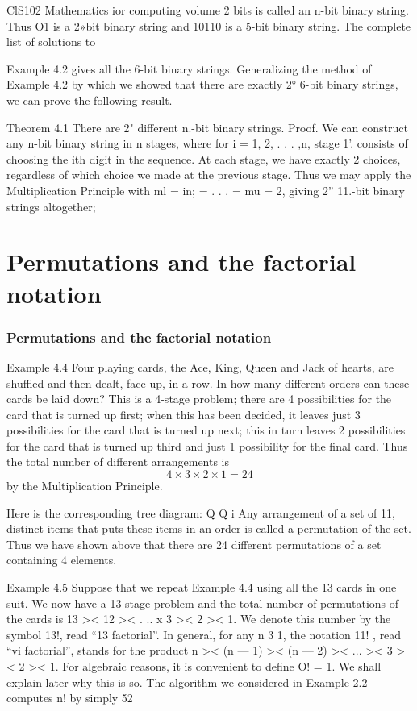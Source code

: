 \documentclass{beamer}
\begin{document}
\begin{frame}
\begin{frame}
ClS102 Mathematics ior computing volume 2
bits is called an n-bit binary string. Thus O1 is a 2»bit binary string
and 10110 is a 5-bit binary string. The complete list of solutions to
\end{frame}
\begin{frame}
Example 4.2 gives all the 6-bit binary strings. Generalizing the
method of Example 4.2 by which we showed that there are exactly
2° 6-bit binary strings, we can prove the following result.
\end{frame}
\begin{frame}
Theorem 4.1 There are 2" different n.-bit binary strings.
Proof. We can construct any n-bit binary string in n stages, where for
i = 1, 2, . . . ,n, stage 1'. consists of choosing the ith digit in the
sequence. At each stage, we have exactly 2 choices, regardless of
which choice we made at the previous stage. Thus we may apply the
Multiplication Principle with ml = in; = . . . = mu = 2, giving 2”
11.-bit binary strings altogether;
\end{frame}
\section{Permutations and the factorial notation}
\begin{frame}
\frametitle{Permutations and the factorial notation}
Example 4.4 Four playing cards, the Ace, King, Queen and Jack of
hearts, are shuffled and then dealt, face up, in a row. In how many
different orders can these cards be laid down?
\bigskip
This is a 4-stage problem; there are 4 possibilities for the card that is
turned up ﬁrst; when this has been decided, it leaves just 3
possibilities for the card that is turned up next; this in turn leaves 2
possibilities for the card that is turned up third and just 1 possibility
for the ﬁnal card. Thus the total number of different arrangements
is \[4 \times 3 \times 2 \times 1 =24\] by the Multiplication Principle. 
\end{frame}
\begin{frame}
Here is the
corresponding tree diagram:
Q
Q
i
Any arrangement of a set of 11, distinct items that puts these items in
an order is called a permutation of the set. Thus we have shown
above that there are 24 different permutations of a set containing 4
elements.
\end{frame}
\begin{frame}
Example 4.5 Suppose that we repeat Example 4.4 using all the 13
cards in one suit. We now have a 13-stage problem and the total
number of permutations of the cards is 13 >< 12 >< . .. x 3 >< 2 >< 1. We
denote this number by the symbol 13!, read “13 factorial”.
In general, for any n 3 1, the notation 11! , read “vi factorial”, stands
for the product n >< (n — 1) >< (n — 2) >< ... >< 3 >< 2 >< 1. For algebraic
reasons, it is convenient to deﬁne
O! = 1.
We shall explain later why this is so.
The algorithm we considered in Example 2.2 computes n! by simply
52




\end{frame}
\end{frame}
\end{document}
